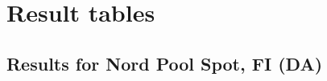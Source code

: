 

\section{Result tables} \label{sec:app_result_tables}







\subsection{Results for Nord Pool Spot, FI (DA)} \label{ssec:app_tables_nord_pool_spot}



